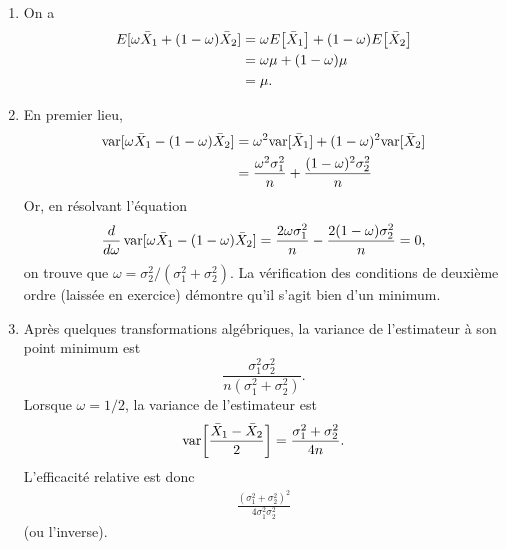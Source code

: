 \begin{solution}{3.20}
    \begin{enumerate}
    \item On a
      \begin{align*}
        E [ \omega \bar{X}_1 + (1 - \omega)\bar{X}_2 ] &=
        \omega E\! \left[ \bar{X}_1 \right] + (1 - \omega)E\! \left[ \bar{X}_2 \right]\\
        &= \omega\mu +(1 - \omega)\mu\\
        &= \mu.
      \end{align*}
    \item En premier lieu,
      \begin{align*}
        \mathrm{var} [ \omega\bar{X}_1 - (1 - \omega)\bar{X}_2 ] &=
        \omega^2 \mathrm{var} [ \bar{X}_1 ] + (1 - \omega)^2 \mathrm{var} [ \bar{X}_2 ]\\
        &= \frac{\omega^2 \sigma_1^2}{n} +
        \frac{(1 - \omega)^2 \sigma_2^2}{n}
      \end{align*}
      Or, en résolvant l'équation
      \begin{equation*}
        \frac{d}{d\omega}\, \mathrm{var} [ \omega \bar{X}_1 - (1 - \omega)\bar{X}_2 ] =
        \frac{2 \omega \sigma_1^2}{n} -
        \frac{2 (1 - \omega) \sigma_2^2}{n} = 0,
      \end{equation*}
      on trouve que $\omega = \sigma_2^2/(\sigma_1^2 + \sigma_2^2)$.
      La vérification des conditions de deuxième ordre (laissée en
      exercice) démontre qu'il s'agit bien d'un minimum.
    \item Après quelques transformations algébriques, la variance de
      l'estimateur à son point minimum est
      \begin{displaymath}
        \frac{\sigma_1^2 \sigma_2^2}{n(\sigma_1^2 + \sigma_2^2)}.
      \end{displaymath}
      Lorsque $\omega = 1/2$, la variance de l'estimateur est
      \begin{equation*}
        \mathrm{var}\! \left[ \frac{\bar{X}_1 - \bar{X}_2}{2} \right] =
        \frac{\sigma_1^2 + \sigma_2^2}{4n}.
      \end{equation*}
      L'efficacité relative est donc
      \begin{align*}
        \frac{(\sigma_1^2 + \sigma_2^2)^2}{4 \sigma_1^2 \sigma_2^2}
      \end{align*}
      (ou l'inverse).
    \end{enumerate}
  
\end{solution}
